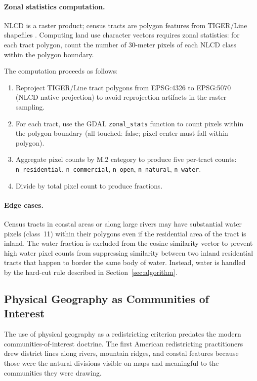 \paragraph{Zonal statistics computation.}
NLCD is a raster product; census tracts are polygon features from TIGER/Line
shapefiles \citep{census2020tiger}.
Computing land use character vectors requires zonal statistics: for each tract
polygon, count the number of 30-meter pixels of each NLCD class within the
polygon boundary.

The computation proceeds as follows:
\begin{enumerate}
  \item Reproject TIGER/Line tract polygons from EPSG:4326 to EPSG:5070
    (NLCD native projection) to avoid reprojection artifacts in the raster
    sampling.
  \item For each tract, use the GDAL \texttt{zonal\_stats} function to count
    pixels within the polygon boundary (all-touched: false; pixel center
    must fall within polygon).
  \item Aggregate pixel counts by M.2 category to produce five per-tract
    counts: \texttt{n\_residential}, \texttt{n\_commercial},
    \texttt{n\_open}, \texttt{n\_natural}, \texttt{n\_water}.
  \item Divide by total pixel count to produce fractions.
\end{enumerate}

\paragraph{Edge cases.}
Census tracts in coastal areas or along large rivers may have substantial water
pixels (class~11) within their polygons even if the residential area of the
tract is inland.
The water fraction is excluded from the cosine similarity vector to prevent
high water pixel counts from suppressing similarity between two inland
residential tracts that happen to border the same body of water.
Instead, water is handled by the hard-cut rule described in
Section~\ref{sec:algorithm}.

\subsection{Physical Geography as Communities of Interest}

The use of physical geography as a redistricting criterion predates the modern
communities-of-interest doctrine.
The first American redistricting practitioners drew district lines along rivers,
mountain ridges, and coastal features because those were the natural divisions
visible on maps and meaningful to the communities they were drawing.

